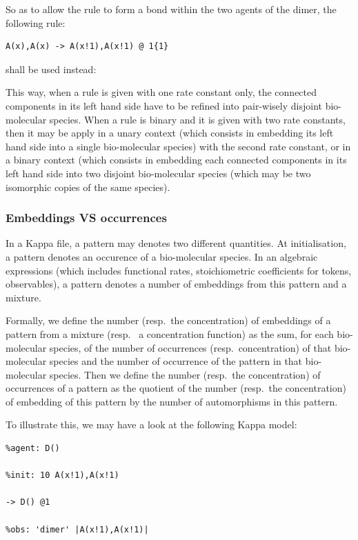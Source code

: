 \documentclass[11pt]{book}
\begin{document}
  So as to allow the rule to form a bond within the two agents of the dimer, the following rule:
  \begin{lstlisting}[language=kappa]
    A(x),A(x) -> A(x!1),A(x!1) @ 1{1}
  \end{lstlisting}
   shall be used instead:

  This way, when a rule is given with one rate constant only, the connected components in its left hand side have to be refined into pair-wisely disjoint bio-molecular species. When a rule is binary and it is given with two rate constants, then it may be apply in a unary context (which consists in embedding its left hand side into a single bio-molecular species) with the second rate constant, or in a binary context (which consists in embedding each connected components in its left hand side into two disjoint bio-molecular species (which may be two isomorphic copies of the same species).

  \subsubsection{Embeddings VS occurrences}

In a Kappa file, a pattern may denotes two different quantities.
At initialisation, a pattern denotes an occurence of a bio-molecular species. In an algebraic expressions (which includes functional rates,
stoichiometric coefficients for tokens, observables), a pattern denotes a number of embeddings from this pattern and a mixture.

Formally, we define the number (resp.~the concentration) of embeddings of a pattern from a mixture (resp.~ a concentration function) as
the sum, for each bio-molecular species,
 of the number of occurrences (resp.~concentration) of that bio-molecular species and the number of occurrence of the pattern in that bio-molecular species. Then we define the number (resp.~the concentration) of occurrences of a pattern as the quotient of
 the number (resp.~the concentration) of embedding of this pattern by the number of automorphisms in this pattern.

To illustrate this, we may have a look at the following Kappa model:
\begin{lstlisting}[language=kappa]
%agent: A(x)
%agent: D()

%init: 10 A(x!1),A(x!1)

-> D() @1

%obs: 'dimer' |A(x!1),A(x!1)|
\end{lstlisting}
\end{document}
